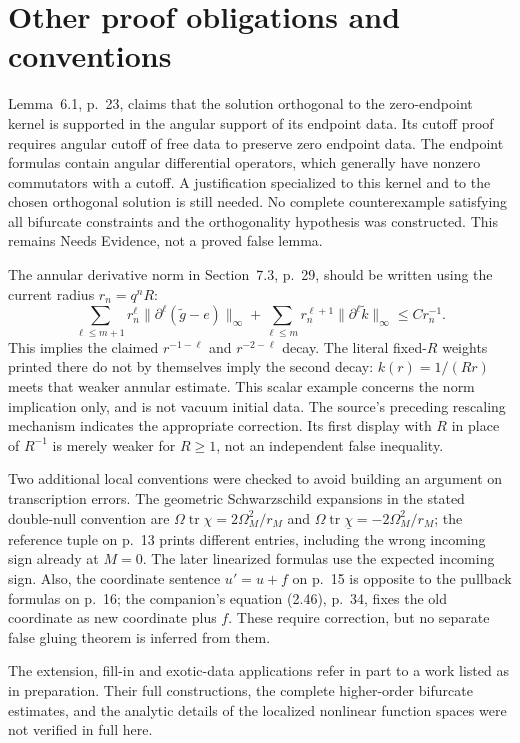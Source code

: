 \documentclass[10pt]{article}
\begin{document}
\section*{Other proof obligations and conventions}
Lemma 6.1, p. 23, claims that the solution orthogonal to the zero-endpoint kernel is supported in the angular support of its endpoint data. Its cutoff proof requires angular cutoff of free data to preserve zero endpoint data. The endpoint formulas contain angular differential operators, which generally have nonzero commutators with a cutoff. A justification specialized to this kernel and to the chosen orthogonal solution is still needed. No complete counterexample satisfying all bifurcate constraints and the orthogonality hypothesis was constructed. This remains Needs Evidence, not a proved false lemma.\par
The annular derivative norm in Section 7.3, p. 29, should be written using the current radius \(r_n=q^nR\): \[\sum_{\ell\leq m+1}r_n^\ell\|\partial^\ell(\widetilde g-e)\|_\infty
 +\sum_{\ell\leq m}r_n^{\ell+1}\|\partial^\ell\widetilde k\|_\infty
      \leq C r_n^{-1}.\] This implies the claimed \(r^{-1-\ell}\) and \(r^{-2-\ell}\) decay. The literal fixed-\(R\) weights printed there do not by themselves imply the second decay: \(k(r)=1/(Rr)\) meets that weaker annular estimate. This scalar example concerns the norm implication only, and is not vacuum initial data. The source’s preceding rescaling mechanism indicates the appropriate correction. Its first display with \(R\) in place of \(R^{-1}\) is merely weaker for \(R\geq1\), not an independent false inequality.\par
Two additional local conventions were checked to avoid building an argument on transcription errors. The geometric Schwarzschild expansions in the stated double-null convention are \(\Omega\operatorname{tr}\chi=2\Omega_M^2/r_M\) and \(\Omega\operatorname{tr}\underline\chi=-2\Omega_M^2/r_M\); the reference tuple on p. 13 prints different entries, including the wrong incoming sign already at \(M=0\). The later linearized formulas use the expected incoming sign. Also, the coordinate sentence \(u'=u+f\) on p. 15 is opposite to the pullback formulas on p. 16; the companion’s equation (2.46), p. 34, fixes the old coordinate as new coordinate plus \(f\). These require correction, but no separate false gluing theorem is inferred from them.\par
The extension, fill-in and exotic-data applications refer in part to a work listed as in preparation. Their full constructions, the complete higher-order bifurcate estimates, and the analytic details of the localized nonlinear function spaces were not verified in full here.\par
\end{document}

